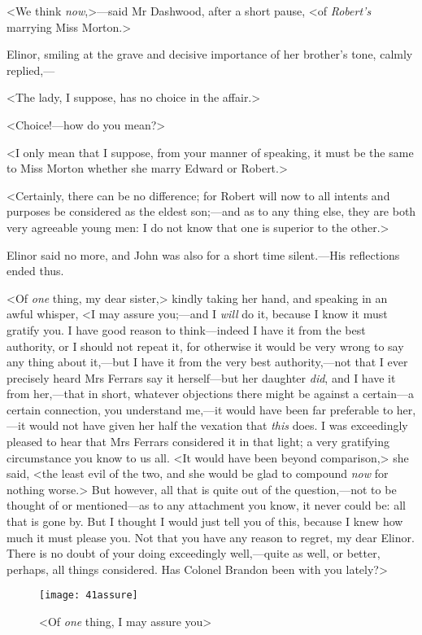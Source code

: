 <We think \textit{now},>—said Mr Dashwood, after a short pause, <of \textit{Robert's} marrying Miss Morton.>

Elinor, smiling at the grave and decisive importance of her brother's tone, calmly replied,—

<The lady, I suppose, has no choice in the affair.>

<Choice!—how do you mean?>

<I only mean that I suppose, from your manner of speaking, it must be the same to Miss Morton whether she marry Edward or Robert.>

<Certainly, there can be no difference; for Robert will now to all intents and purposes be considered as the eldest son;—and as to any thing else, they are both very agreeable young men: I do not know that one is superior to the other.>

Elinor said no more, and John was also for a short time silent.—His reflections ended thus.

<Of \textit{one} thing, my dear sister,> kindly taking her hand, and speaking in an awful whisper, <I may assure you;—and I \textit{will} do it, because I know it must gratify you. I have good reason to think—indeed I have it from the best authority, or I should not repeat it, for otherwise it would be very wrong to say any thing about it,—but I have it from the very best authority,—not that I ever precisely heard Mrs Ferrars say it herself—but her daughter \textit{did}, and I have it from her,—that in short, whatever objections there might be against a certain—a certain connection, you understand me,—it would have been far preferable to her,—it would not have given her half the vexation that \textit{this} does. I was exceedingly pleased to hear that Mrs Ferrars considered it in that light; a very gratifying circumstance you know to us all. <It would have been beyond comparison,> she said, <the least evil of the two, and she would be glad to compound \textit{now} for nothing worse.> But however, all that is quite out of the question,—not to be thought of or mentioned—as to any attachment you know, it never could be: all that is gone by. But I thought I would just tell you of this, because I knew how much it must please you. Not that you have any reason to regret, my dear Elinor. There is no doubt of your doing exceedingly well,—quite as well, or better, perhaps, all things considered. Has Colonel Brandon been with you lately?>

\begin{figure}[tbph]
\centering
\texttt{[image: 41assure]}
\caption{<Of \textit{one} thing, I may assure you>}
\end{figure}


